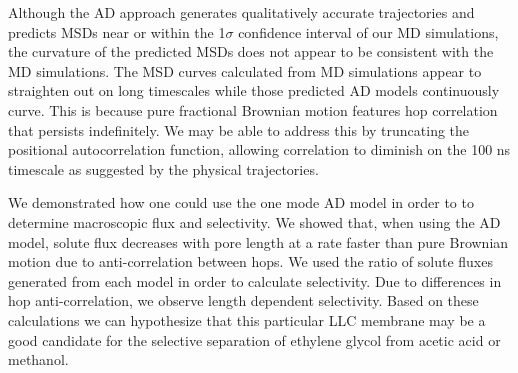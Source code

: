 \documentclass[aps,pre,preprint,groupedaddress,longbibliography]{revtex4-2}
\begin{document}
  Although the AD approach generates qualitatively accurate trajectories and 
  predicts MSDs near or within the 1$\sigma$ confidence interval of our
  MD simulations, the curvature of the predicted MSDs does not appear to be consistent
  with the MD simulations. The MSD curves calculated from MD simulations 
  appear to straighten out on long timescales while those predicted
  AD models continuously curve. This is because pure fractional Brownian motion
  features hop correlation that persists indefinitely. We may be able to address
  this by truncating the positional autocorrelation function, allowing 
  correlation to diminish on the 100 ns timescale as suggested by the physical 
  trajectories.

  We demonstrated how one could use the one mode AD model in order to to determine
  macroscopic flux and selectivity. We showed that, when using the AD model, 
  solute flux decreases with pore length at a rate faster than pure 
  Brownian motion due to anti-correlation between hops. We used the ratio of 
  solute fluxes generated from each model in order to calculate selectivity. 
  Due to differences in hop anti-correlation, we observe length dependent 
  selectivity. Based on these calculations we can hypothesize that this 
  particular LLC membrane may be a good candidate for the selective separation
  of ethylene glycol from acetic acid or methanol.
  
\end{document}
